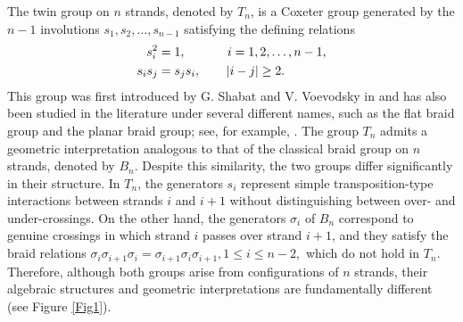 \documentclass[reqno]{amsart}
\begin{document}
The twin group on $n$ strands, denoted by $T_n$, is a Coxeter group generated by the $n-1$ involutions $s_1,s_2,\ldots,s_{n-1}$ satisfying the defining relations
\begin{align*} 
s_i^2 & =1, \quad \ \qquad i=1,2,\ldots,n-1,\\ 
s_is_j& =s_js_i, \hspace*{0.02cm} \qquad |i-j|\ge 2. 
\end{align*}
This group was first introduced by G. Shabat and V. Voevodsky in \cite{Shabat1990} and has also been studied in the literature under several different names, such as the flat braid group and the planar braid group; see, for example, \cite{Khovanov1996, Khovanov1997, Merkov1999}. The group $T_n$ admits a geometric interpretation analogous to that of the classical braid group on $n$ strands, denoted by $B_n$. Despite this similarity, the two groups differ significantly in their structure. In $T_n$, the generators $s_i$ represent simple transposition-type interactions between strands $i$ and $i+1$ without distinguishing between over- and under-crossings. On the other hand, the generators $\sigma_i$ of $B_n$ correspond to genuine crossings in which strand $i$ passes over strand $i+1$, and they satisfy the braid relations $\sigma_i\sigma_{i+1}\sigma_i=\sigma_{i+1}\sigma_i\sigma_{i+1}, 1\le i\le n-2,$ which do not hold in $T_n$. Therefore, although both groups arise from configurations of $n$ strands, their algebraic structures and geometric interpretations are fundamentally different (see Figure \ref{Fig1}).
\end{document}
